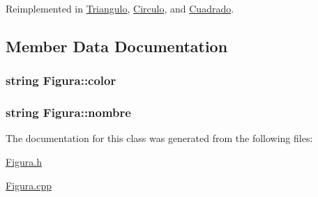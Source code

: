 Reimplemented in \hyperlink{class_triangulo_a6f5c542675a726b35f48f953bb2d9acf}{Triangulo}, \hyperlink{class_circulo_acc35f8fdd7303fca9fe54b0da458bdf2}{Circulo}, and \hyperlink{class_cuadrado_aa7072852e41bde681376b57503495c74}{Cuadrado}.



\subsection{Member Data Documentation}
\hypertarget{class_figura_a9f519b9504b95440f124a3099070e952}{
\subsubsection[{color}]{\setlength{\rightskip}{0pt plus 5cm}string Figura\+::color}}\label{class_figura_a9f519b9504b95440f124a3099070e952}
\hypertarget{class_figura_a5be336617ed8a4d4f28115297b38da02}{
\subsubsection[{nombre}]{\setlength{\rightskip}{0pt plus 5cm}string Figura\+::nombre}}\label{class_figura_a5be336617ed8a4d4f28115297b38da02}


The documentation for this class was generated from the following files\+:\begin{DoxyCompactItemize}
\item 
\hyperlink{_figura_8h}{Figura.\+h}\item 
\hyperlink{_figura_8cpp}{Figura.\+cpp}\end{DoxyCompactItemize}
